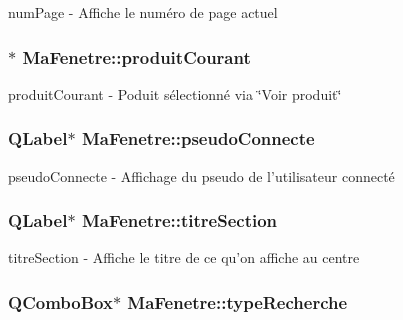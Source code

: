 num\-Page -\/ Affiche le numéro de page actuel 

\hypertarget{class_ma_fenetre_abc16cc0e7668b65019bffe2d595be2a0}{
\subsubsection[{produit\-Courant}]{$\ast$ Ma\-Fenetre\-::produit\-Courant\hspace{0.3cm}{\ttfamily [protected]}}}\label{class_ma_fenetre_abc16cc0e7668b65019bffe2d595be2a0}


produit\-Courant -\/ Poduit sélectionné via \char`\"{}\-Voir produit\char`\"{} 

\hypertarget{class_ma_fenetre_ae7932944c172401e793af721335e7c3d}{
\subsubsection[{pseudo\-Connecte}]{\setlength{\rightskip}{0pt plus 5cm}Q\-Label$\ast$ Ma\-Fenetre\-::pseudo\-Connecte\hspace{0.3cm}{\ttfamily [protected]}}}\label{class_ma_fenetre_ae7932944c172401e793af721335e7c3d}


pseudo\-Connecte -\/ Affichage du pseudo de l'utilisateur connecté 

\hypertarget{class_ma_fenetre_ac4749f9608f7c8d6e5d60434ddbedfc5}{
\subsubsection[{titre\-Section}]{\setlength{\rightskip}{0pt plus 5cm}Q\-Label$\ast$ Ma\-Fenetre\-::titre\-Section\hspace{0.3cm}{\ttfamily [protected]}}}\label{class_ma_fenetre_ac4749f9608f7c8d6e5d60434ddbedfc5}


titre\-Section -\/ Affiche le titre de ce qu'on affiche au centre 

\hypertarget{class_ma_fenetre_a3df6a320b8835369da88bf94b701ae76}{
\subsubsection[{type\-Recherche}]{\setlength{\rightskip}{0pt plus 5cm}Q\-Combo\-Box$\ast$ Ma\-Fenetre\-::type\-Recherche\hspace{0.3cm}{\ttfamily [protected]}}}\label{class_ma_fenetre_a3df6a320b8835369da88bf94b701ae76}


